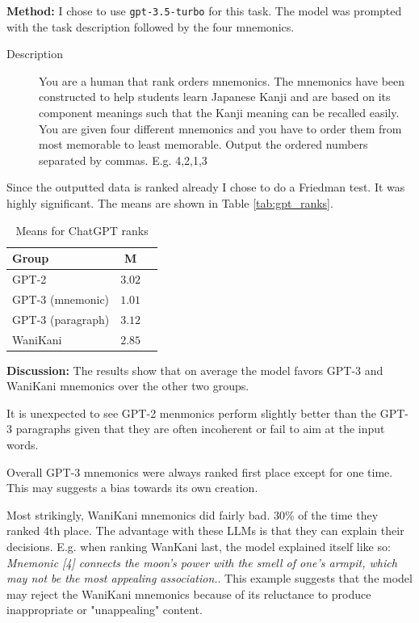 \textbf{Method:} I chose to use \texttt{gpt-3.5-turbo} for this task. The model was prompted with the task description followed by the four mnemonics.
\begin{description}
\item[Description]You are a human that rank orders mnemonics. The mnemonics have been constructed to help students learn Japanese Kanji and are based on its component meanings such that the Kanji meaning can be recalled easily. You are given four different mnemonics and you have to order them from most memorable to least memorable.
Output the ordered numbers separated by commas. E.g. 4,2,1,3 
\end{description}
Since the outputted data is ranked already I chose to do a Friedman test. It was highly significant. The means are shown in Table \ref{tab:gpt_ranks}.
\begin{table}[ht] 
\centering
\caption{Means for ChatGPT ranks}
\label{tab:gpt_ranks}
\begin{tabular}{lcc}
\toprule
Group & M \\
\midrule
GPT-2& $3.02$  \\
GPT-3 (mnemonic) & $1.01$ \\
GPT-3 (paragraph)& $3.12$ \\
WaniKani & $2.85$ \\
\bottomrule
\end{tabular}
\label{tab:multipartite_rank_centrality}
\end{table}

\textbf{Discussion:} The results show that on average the model favors GPT-3 and WaniKani mnemonics over the other two groups.

It is unexpected to see GPT-2 menmonics perform slightly better than the GPT-3 paragraphs given that they are often incoherent or fail to aim at the input words.

Overall GPT-3 mnemonics were always ranked first place except for one time. This may suggests a bias towards its own creation.

Most strikingly, WaniKani mnemonics did fairly bad. 30\% of the time they ranked 4th place. The advantage with these LLMs is that they can explain their decisions. E.g. when ranking WanKani last, the model explained itself like so: \emph{Mnemonic [4] connects the moon's power with the smell of one's armpit, which may not be the most appealing association.}. This example suggests that the model may reject the WaniKani mnemonics because of its reluctance to produce inappropriate or "unappealing" content.

